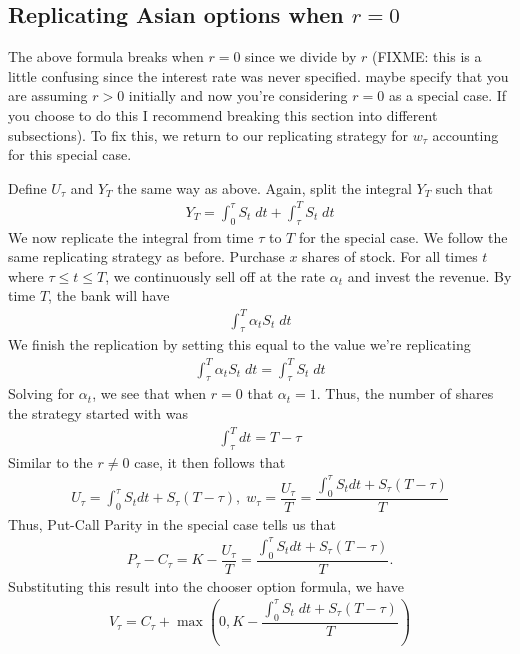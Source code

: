\documentclass[reqno]{amsart}
\begin{document}
\subsection{Replicating Asian options when $r = 0$}
The above formula breaks when $r = 0$ since we divide by $r$ (FIXME: this is a little confusing since the interest rate was never specified. maybe specify that you are assuming $r > 0$ initially and now you're considering $r = 0$ as a special case. If you choose to do this I recommend breaking this section into different subsections). To fix this, we return to our replicating strategy for $w_\tau$ accounting for this special case.

Define $U_\tau$ and $Y_T$ the same way as above. Again, split the integral $Y_T$ such that
\begin{align}
     Y_T = \int_0^\tau S_t \; dt + \int_\tau^T S_t \; dt
\end{align}
We now replicate the integral from time $\tau$ to $T$ for the special case. We follow the same replicating strategy as before. Purchase $x$ shares of stock. For all times $t$ where $\tau \leq t \leq T$, we continuously sell off at the rate $\alpha_t$ and invest the revenue. 
By time $T$, the bank will have 
\begin{align}
     \int_\tau^T \alpha_t S_t \; dt
\end{align}
We finish the replication by setting this equal to the value we're replicating
\begin{align}
     \int_\tau^T \alpha_t S_t \; dt = \int_\tau^T S_t \; dt
\end{align}
Solving for $\alpha_t$, we see that when $r = 0$ that $\alpha_t = 1$. Thus, the number of shares the strategy started with was
\begin{align}
     \int_\tau^T dt = T - \tau
\end{align}
Similar to the $r \neq 0$ case, it then follows that
\begin{align}
     U_\tau = \int_0^\tau S_t dt + S_\tau (T - \tau), \; w_\tau = \dfrac{U_\tau}{T} = \dfrac{\int_0^\tau S_t dt + S_\tau (T - \tau)}{T}
\end{align}
Thus, Put-Call Parity in the special case tells us that 
\begin{align}
     P_\tau - C_\tau = K - \dfrac{U_\tau}{T} = \dfrac{\int_0^\tau S_t dt + S_\tau (T - \tau)}{T}.
\end{align}
Substituting this result into the chooser option formula, we have
\begin{align}
     V_\tau = C_\tau + \max(0, K - \dfrac{\int_0^\tau S_t \; dt + S_\tau (T - \tau)}{T})
\end{align}
\end{document}
